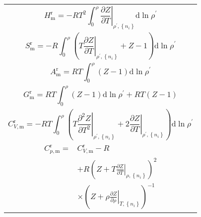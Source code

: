 \documentclass[main.tex]{subfiles}
\begin{document}
\begin{longtable}{m{}}
    \begin{equation}
        H^\text{r}_\text{m}  =-R T^2\int_0^\rho\left.\frac{\partial Z}{\partial T}\right|_{\rho^\prime,\left\{n_i\right\}}\mathrm{d}\ln\rho^\prime
    \end{equation}                                                                                                 \\[-5ex]
    \begin{equation}
        S^\text{r}_\text{m}  =-R\int_0^\rho\left(T\left.\frac{\partial Z}{\partial T}\right|_{\rho^\prime,\left\{n_i\right\}}+Z-1\right)\mathrm{d}\ln\rho^\prime
    \end{equation}                                                                                   \\ [-5ex]
    \begin{equation}
        A^\text{r}_\text{m}  =RT\int_0^\rho\left(Z-1\right)\mathrm{d}\ln\rho^\prime
    \end{equation}                                                                                                                                                                \\ [-5ex]
    \begin{equation}
        G^\text{r}_\text{m}  =RT\int_0^\rho\left(Z-1\right)\mathrm{d}\ln\rho^\prime+RT\left(Z-1\right)
    \end{equation}                                                                                                                                             \\ [-5ex]
    \begin{equation}
        C^\text{r}_{V,\text{m}}  =-RT\int_0^\rho\left(T\left.\frac{\partial^2 Z}{\partial T^2}\right|_{\rho^\prime,\left\{n_i\right\}}+2\left.\frac{\partial Z}{\partial T}\right|_{\rho^\prime,\left\{n_i\right\}}\right)\mathrm{d}\ln\rho^\prime
    \end{equation} \\ [-5ex]
    \begin{equation}
        \begin{aligned}
            C^\text{r}_{p,\text{m}}  = & C^\text{r}_{V,\text{m}}-R                                                                          \\
                                       & +R\left(Z+T\left.\frac{\partial Z}{\partial T}\right|_{\rho,\left\{n_i\right\}}\right)^2           \\
                                       & \times\left(Z+\rho\left.\frac{\partial Z}{\partial \rho}\right|_{T,\left\{n_i\right\}}\right)^{-1}
        \end{aligned}
    \end{equation}                                                                                                                                                                                                                 \\
    \hline
\end{longtable}
\end{document}
